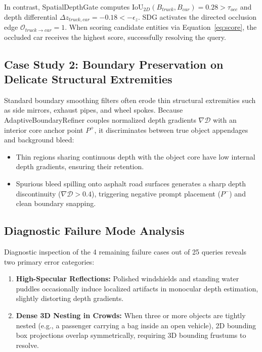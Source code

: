 \documentclass[10pt,twocolumn,letterpaper]{article}
\begin{document}
In contrast, SpatialDepthGate computes $\mathrm{IoU}_{2D}(B_{truck}, B_{car}) = 0.28 > \tau_{occ}$ and depth differential $\Delta z_{truck, car} = -0.18 < -\epsilon_z$. SDG activates the directed occlusion edge $\mathcal{O}_{truck \to car} = 1$. When scoring candidate entities via Equation~\eqref{eq:score}, the occluded car receives the highest score, successfully resolving the query.

\subsection{Case Study 2: Boundary Preservation on Delicate Structural Extremities}
Standard boundary smoothing filters often erode thin structural extremities such as side mirrors, exhaust pipes, and wheel spokes. Because AdaptiveBoundaryRefiner couples normalized depth gradients $\nabla \mathcal{D}$ with an interior core anchor point $P^+$, it discriminates between true object appendages and background bleed:
\begin{itemize}[leftmargin=*,itemsep=1pt]
    \item Thin regions sharing continuous depth with the object core have low internal depth gradients, ensuring their retention.
    \item Spurious bleed spilling onto asphalt road surfaces generates a sharp depth discontinuity ($\nabla \mathcal{D} > 0.4$), triggering negative prompt placement ($P^-$) and clean boundary snapping.
\end{itemize}

\subsection{Diagnostic Failure Mode Analysis}
Diagnostic inspection of the 4 remaining failure cases out of 25 queries reveals two primary error categories:
\begin{enumerate}[leftmargin=*,itemsep=1pt]
    \item \textbf{High-Specular Reflections:} Polished windshields and standing water puddles occasionally induce localized artifacts in monocular depth estimation, slightly distorting depth gradients.
    \item \textbf{Dense 3D Nesting in Crowds:} When three or more objects are tightly nested (e.g., a passenger carrying a bag inside an open vehicle), 2D bounding box projections overlap symmetrically, requiring 3D bounding frustums to resolve.
\end{enumerate}
\end{document}
